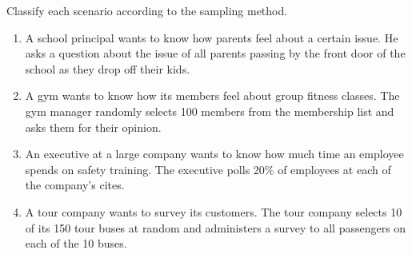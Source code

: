 \documentclass{ximera}
\begin{document}
\begin{problem}\label{prob:140hom1prob3}
Classify each scenario according to the sampling method.
\begin{enumerate}
    \item A school principal wants to know how parents feel about a certain issue.  He asks a question about the issue of all parents passing by the front door of the school as they drop off their kids.
    \begin{multipleChoice}  
\end{multipleChoice}  

 \item A gym wants to know how its members feel about group fitness classes.  The gym manager randomly selects 100 members from the membership list and asks them for their opinion.
    \begin{multipleChoice}  
\end{multipleChoice}  

\item An executive at a large company wants to know how much time an employee spends on safety training.  The executive polls 20\% of employees at each of the company's cites.
    \begin{multipleChoice}  
\end{multipleChoice}  

\item A tour company wants to survey its customers.  The tour company selects 10 of its 150 tour buses at random and administers a survey to all passengers on each of the 10 buses.
    \begin{multipleChoice}  
\end{multipleChoice}  
\end{enumerate}
\end{problem}
\end{document}
